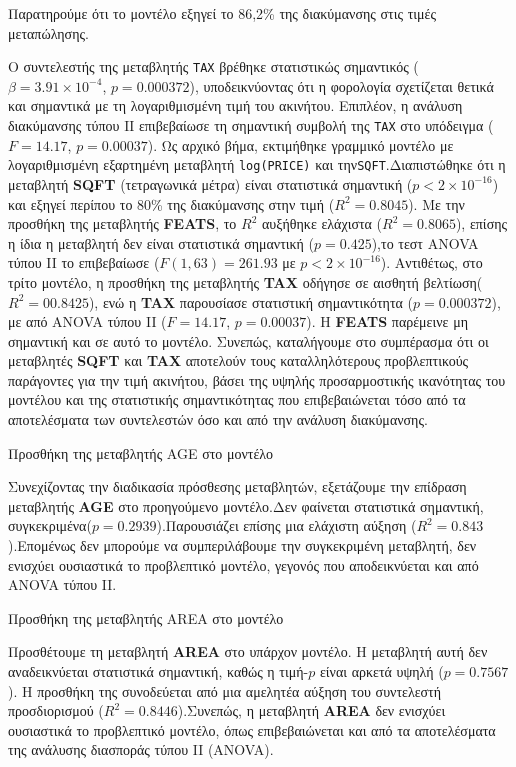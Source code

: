 \documentclass[
  10pt,
]{article}
\begin{document}
Παρατηρούμε ότι το μοντέλο εξηγεί το 86,2\% της διακύμανσης στις τιμές
μεταπώλησης.

Ο συντελεστής της μεταβλητής \texttt{TAX} βρέθηκε στατιστικώς σημαντικός
(\(\beta = 3.91 \times 10^{-4}\), \(p = 0.000372\)), υποδεικνύοντας ότι
η φορολογία σχετίζεται θετικά και σημαντικά με τη λογαριθμισμένη τιμή
του ακινήτου. Επιπλέον, η ανάλυση διακύμανσης τύπου ΙΙ επιβεβαίωσε τη
σημαντική συμβολή της \texttt{TAX} στο υπόδειγμα (\(F = 14.17\),
\(p = 0.00037\)). Ως αρχικό βήμα, εκτιμήθηκε γραμμικό μοντέλο με
λογαριθμισμένη εξαρτημένη μεταβλητή \texttt{log(PRICE)} και
την\texttt{SQFT}.Διαπιστώθηκε ότι η μεταβλητή \textbf{SQFT} (τετραγωνικά
μέτρα) είναι στατιστικά σημαντική (\(p < 2 \times 10^{-16}\)) και εξηγεί
περίπου το 80\% της διακύμανσης στην τιμή (\(R^2 = 0.8045\)). Με την
προσθήκη της μεταβλητής \textbf{FEATS}, το \(R^2\) αυξήθηκε ελάχιστα
(\(R^2 = 0.8065\)), επίσης η ίδια η μεταβλητή δεν είναι στατιστικά
σημαντική (\(p = 0.425\)),το τεστ ANOVA τύπου II το επιβεβαίωσε
(\(F(1, 63) = 261.93\) με \(p < 2 \times 10^{-16}\)). Αντιθέτως, στο
τρίτο μοντέλο, η προσθήκη της μεταβλητής \textbf{TAX} οδήγησε σε αισθητή
βελτίωση(\(R^2 = 00.8425\)), ενώ η \textbf{TAX} παρουσίασε στατιστική
σημαντικότητα (\(p = 0.000372\)), με από ANOVA τύπου II (\(F = 14.17\),
\(p = 0.00037\)). Η \textbf{FEATS} παρέμεινε μη σημαντική και σε αυτό το
μοντέλο. Συνεπώς, καταλήγουμε στο συμπέρασμα ότι οι μεταβλητές
\textbf{SQFT} και \textbf{TAX} αποτελούν τους καταλληλότερους
προβλεπτικούς παράγοντες για την τιμή ακινήτου, βάσει της υψηλής
προσαρμοστικής ικανότητας του μοντέλου και της στατιστικής
σημαντικότητας που επιβεβαιώνεται τόσο από τα αποτελέσματα των
συντελεστών όσο και από την ανάλυση διακύμανσης.

Προσθήκη της μεταβλητής AGE στο μοντέλο

Συνεχίζοντας την διαδικασία πρόσθεσης μεταβλητών, εξετάζουμε την
επίδραση μεταβλητής \textbf{AGE} στο προηγούμενο μοντέλο.Δεν φαίνεται
στατιστικά σημαντική, συγκεκριμένα(\(p = 0.2939\)).Παρουσιάζει επίσης
μια ελάχιστη αύξηση (\(R^2 = 0.843\)).Επομένως δεν μπορούμε να
συμπεριλάβουμε την συγκεκριμένη μεταβλητή, δεν ενισχύει ουσιαστικά το
προβλεπτικό μοντέλο, γεγονός που αποδεικνύεται και από ANOVA τύπου II.

Προσθήκη της μεταβλητής AREA στο μοντέλο

Προσθέτουμε τη μεταβλητή \textbf{AREA} στο υπάρχον μοντέλο. Η μεταβλητή
αυτή δεν αναδεικνύεται στατιστικά σημαντική, καθώς η τιμή-\(p\) είναι
αρκετά υψηλή (\(p = 0.7567\)). Η προσθήκη της συνοδεύεται από μια
αμελητέα αύξηση του συντελεστή προσδιορισμού (\(R^2 = 0.8446\)).Συνεπώς,
η μεταβλητή \textbf{AREA} δεν ενισχύει ουσιαστικά το προβλεπτικό
μοντέλο, όπως επιβεβαιώνεται και από τα αποτελέσματα της ανάλυσης
διασποράς τύπου II (ANOVA).
\end{document}
